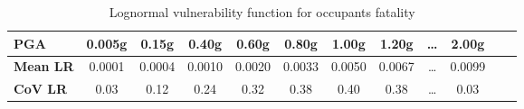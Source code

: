 \begin{table}[h]

\centering
\begin{tabular}{ l c c c c c c c c c c c}

\hline
\rowcolor{anti-flashwhite}
\bf{PGA} & \bf{0.005g} & \bf{0.15g} & \bf{0.40g} & \bf{0.60g} & \bf{0.80g} & \bf{1.00g} & \bf{1.20g} & \bf{\dots} & \bf{2.00g} \\
\hline
\bf{Mean LR} & 0.0001 & 0.0004 & 0.0010 & 0.0020 & 0.0033 & 0.0050 & 0.0067 & \dots & 0.0099 \\
\bf{CoV LR} & 0.03 & 0.12 & 0.24 & 0.32 & 0.38 & 0.40 & 0.38 & \dots & 0.03 \\
\hline
\end{tabular}

\caption{Lognormal vulnerability function for occupants fatality}
\label{tab:vf-ln-tax1-occ}
\end{table}